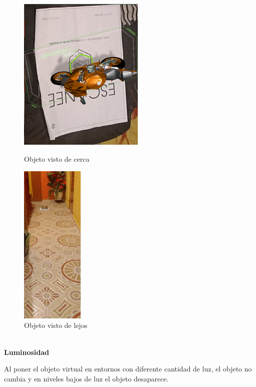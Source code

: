 \begin{figure}[H]
	\begin{minipage}{0.48\textwidth}
		\centering
		\includegraphics[width=6cm]{desarrollo/secciones/pruebas/Vuforia/img/4.png}
		\caption{Objeto visto de cerca}
		\label{fig:vuforiaCerca}
	\end{minipage}\hfill
	\begin{minipage}{0.48\textwidth}
		\centering
		\includegraphics[width=3cm]{desarrollo/secciones/pruebas/Vuforia/img/8.png}
		\caption{Objeto visto de lejos}
		\label{fig:vuforiaLejos}
	\end{minipage}\hfill
\end{figure}

\textbf{\\Luminosidad} \par
Al poner el objeto virtual en entornos con diferente cantidad de luz, el objeto no cambia y en niveles bajos de luz el objeto desaparece.

